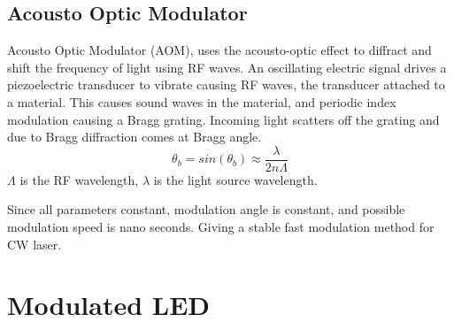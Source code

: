 \documentclass[\main/master.tex]{subfiles}
\begin{document}
\subsection{Acousto Optic Modulator}
Acousto Optic Modulator (AOM), uses the acousto-optic effect to diffract and shift the frequency of light using RF waves. An oscillating electric signal drives a piezoelectric transducer to vibrate causing RF waves, the transducer attached to a material. This causes sound waves in the material, and periodic index modulation causing a Bragg grating. Incoming light scatters off the grating and due to Bragg diffraction comes at Bragg angle.
\begin{equation}
\theta_b = sin(\theta_b)\approx \frac{\lambda}{2n\Lambda} \label{eqn:energy-mass-equivalence-relation}
\end{equation} 
$\Lambda$ is the RF wavelength, $\lambda$ is the light source wavelength. 
\par
Since all parameters constant, modulation angle is constant, and possible modulation speed is nano seconds. Giving a stable fast modulation method for CW laser.


\section{Modulated LED}
\end{document}
